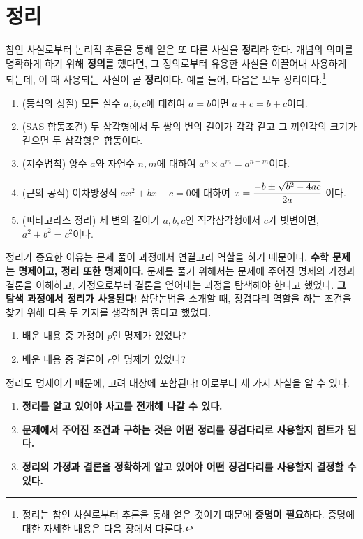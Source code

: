 \pagebreak

\section{정리}

참인 사실로부터 논리적 추론을 통해 얻은 또 다른 사실을 \textbf{정리}라 한다. 개념의 의미를 명확하게 하기 위해 \textbf{정의}를 했다면, 그 정의로부터 유용한 사실을 이끌어내 사용하게 되는데, 이 때 사용되는 사실이 곧 \textbf{정리}이다. 예를 들어, 다음은 모두 정리이다.\footnote{정리는 참인 사실로부터 추론을 통해 얻은 것이기 때문에 \textbf{증명이 필요}하다. 증명에 대한 자세한 내용은 다음 장에서 다룬다.}

\begin{enumerate}
    \item (등식의 성질) 모든 실수 \(a, b, c\)에 대하여 \(a = b\)이면 \(a + c = b + c\)이다.
    \item (SAS 합동조건) 두 삼각형에서 두 쌍의 변의 길이가 각각 같고 그 끼인각의 크기가 같으면 두 삼각형은 합동이다.
    \item (지수법칙) 양수 \(a\)와 자연수 \(n, m\)에 대하여 \(a^n \times a^m = a^{n + m}\)이다.
    \item (근의 공식) 이차방정식 \(ax^2 + bx + c = 0\)에 대하여 \(x = \displaystyle \frac{-b \pm \sqrt{b^2 - 4ac}}{2a}\) 이다.
    \item (피타고라스 정리) 세 변의 길이가 \(a, b, c\)인 직각삼각형에서 \(c\)가 빗변이면, \(a^2 + b^2 = c^2\)이다.
\end{enumerate}

정리가 중요한 이유는 문제 풀이 과정에서 연결고리 역할을 하기 때문이다. \textbf{수학 문제는 명제이고, 정리 또한 명제이다.} 문제를 풀기 위해서는 문제에 주어진 명제의 가정과 결론을 이해하고, 가정으로부터 결론을 얻어내는 과정을 탐색해야 한다고 했었다. \textbf{그 탐색 과정에서 정리가 사용된다!} 삼단논법을 소개할 때, 징검다리 역할을 하는 조건을 찾기 위해 다음 두 가지를 생각하면 좋다고 했었다.

\begin{enumerate}
    \item 배운 내용 중 가정이 \(p\)인 명제가 있었나?
    \item 배운 내용 중 결론이 \(r\)인 명제가 있었나?
\end{enumerate}

정리도 명제이기 때문에, 고려 대상에 포함된다! 이로부터 세 가지 사실을 알 수 있다.

\begin{enumerate}
    \item \textbf{정리를 알고 있어야 사고를 전개해 나갈 수 있다.}
    \item \textbf{문제에서 주어진 조건과 구하는 것은 어떤 정리를 징검다리로 사용할지 힌트가 된다.}
    \item \textbf{정리의 가정과 결론을 정확하게 알고 있어야 어떤 징검다리를 사용할지 결정할 수 있다.}
\end{enumerate}

